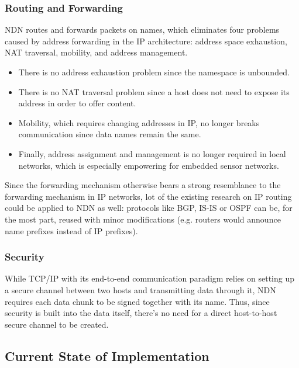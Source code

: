             \subsubsection{Routing and Forwarding}
                NDN routes and forwards packets on names, which eliminates four problems caused by address forwarding in the IP architecture: address space exhaustion, NAT traversal, mobility, and address management.
                \begin{itemize}
                    \item There is no address exhaustion problem since the namespace is unbounded.
                    \item There is no NAT traversal problem since a host does not need to expose its address in order to offer content.
                    \item Mobility, which requires changing addresses in IP, no longer breaks communication since data names remain the same.
                    \item Finally, address assignment and management is no longer required in local networks, which is especially empowering for embedded sensor networks.
                \end{itemize}

                Since the forwarding mechanism otherwise bears a strong resemblance to the forwarding mechanism in IP networks, lot of the existing research on IP routing could be applied to NDN as well: protocols like BGP, IS-IS or OSPF can be, for the most part, reused with minor modifications (e.g. routers would announce name prefixes instead of IP prefixes).

            \subsubsection{Security}
                While TCP/IP with its end-to-end communication paradigm relies on setting up a secure channel between two hosts and transmitting data through it, NDN requires each data chunk to be signed together with its name. Thus, since security is built into the data itself, there's no need for a direct host-to-host secure channel to be created.

        \subsection{Current State of Implementation}



